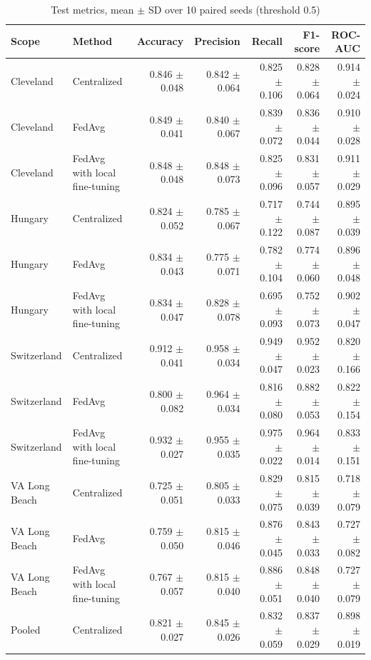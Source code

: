 \begin{table}[ht]
\centering
\small
\caption{Test metrics, mean $\pm$ SD over 10 paired seeds (threshold 0.5)}
\label{tab:table2_test_results}
\begin{tabular}{llrrrrr}
\toprule
Scope & Method & Accuracy & Precision & Recall & F1-score & ROC-AUC \\
\midrule
Cleveland & Centralized & 0.846 $\pm$ 0.048 & 0.842 $\pm$ 0.064 & 0.825 $\pm$ 0.106 & 0.828 $\pm$ 0.064 & 0.914 $\pm$ 0.024 \\
Cleveland & FedAvg & 0.849 $\pm$ 0.041 & 0.840 $\pm$ 0.067 & 0.839 $\pm$ 0.072 & 0.836 $\pm$ 0.044 & 0.910 $\pm$ 0.028 \\
Cleveland & FedAvg with local fine-tuning & 0.848 $\pm$ 0.048 & 0.848 $\pm$ 0.073 & 0.825 $\pm$ 0.096 & 0.831 $\pm$ 0.057 & 0.911 $\pm$ 0.029 \\
Hungary & Centralized & 0.824 $\pm$ 0.052 & 0.785 $\pm$ 0.067 & 0.717 $\pm$ 0.122 & 0.744 $\pm$ 0.087 & 0.895 $\pm$ 0.039 \\
Hungary & FedAvg & 0.834 $\pm$ 0.043 & 0.775 $\pm$ 0.071 & 0.782 $\pm$ 0.104 & 0.774 $\pm$ 0.060 & 0.896 $\pm$ 0.048 \\
Hungary & FedAvg with local fine-tuning & 0.834 $\pm$ 0.047 & 0.828 $\pm$ 0.078 & 0.695 $\pm$ 0.093 & 0.752 $\pm$ 0.073 & 0.902 $\pm$ 0.047 \\
Switzerland & Centralized & 0.912 $\pm$ 0.041 & 0.958 $\pm$ 0.034 & 0.949 $\pm$ 0.047 & 0.952 $\pm$ 0.023 & 0.820 $\pm$ 0.166 \\
Switzerland & FedAvg & 0.800 $\pm$ 0.082 & 0.964 $\pm$ 0.034 & 0.816 $\pm$ 0.080 & 0.882 $\pm$ 0.053 & 0.822 $\pm$ 0.154 \\
Switzerland & FedAvg with local fine-tuning & 0.932 $\pm$ 0.027 & 0.955 $\pm$ 0.035 & 0.975 $\pm$ 0.022 & 0.964 $\pm$ 0.014 & 0.833 $\pm$ 0.151 \\
VA Long Beach & Centralized & 0.725 $\pm$ 0.051 & 0.805 $\pm$ 0.033 & 0.829 $\pm$ 0.075 & 0.815 $\pm$ 0.039 & 0.718 $\pm$ 0.079 \\
VA Long Beach & FedAvg & 0.759 $\pm$ 0.050 & 0.815 $\pm$ 0.046 & 0.876 $\pm$ 0.045 & 0.843 $\pm$ 0.033 & 0.727 $\pm$ 0.082 \\
VA Long Beach & FedAvg with local fine-tuning & 0.767 $\pm$ 0.057 & 0.815 $\pm$ 0.040 & 0.886 $\pm$ 0.051 & 0.848 $\pm$ 0.040 & 0.727 $\pm$ 0.079 \\
Pooled & Centralized & 0.821 $\pm$ 0.027 & 0.845 $\pm$ 0.026 & 0.832 $\pm$ 0.059 & 0.837 $\pm$ 0.029 & 0.898 $\pm$ 0.019 \\

\end{tabular}
\end{table}
